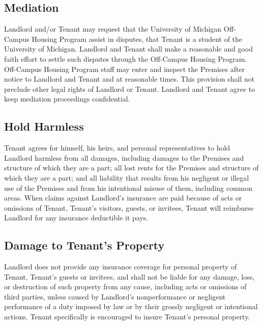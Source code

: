 \documentclass{article}
\begin{document}
\subsection{Mediation}
Landlord and/or Tenant may request that the University of Michigan Off-Campus
Housing Program assist in disputes,  that Tenant is a
student of the University of Michigan. Landlord and Tenant shall make a
reasonable and good faith effort to settle such disputes through the Off-Campus
Housing Program. Off-Campus Housing Program staff may enter and inspect the
Premises after notice to Landlord and Tenant and at reasonable times. This
provision shall not preclude other legal rights of Landlord or Tenant. Landlord
and Tenant agree to keep mediation proceedings confidential.

\subsection{Hold Harmless}
Tenant agrees for himself, his heirs, and personal representatives to hold
Landlord harmless from all damages, including damages to the Premises and
structure of which they are a part; all lost rents for the Premises and
structure of which they are a part; and all liability that results from his
negligent or illegal use of the Premises and from his intentional misuse of
them, including common areas. When claims against Landlord’s insurance are paid
because of acts or omissions of Tenant, Tenant’s visitors, guests, or invitees,
Tenant will reimburse Landlord for any insurance deductible it pays.

\subsection{Damage to Tenant’s Property}
Landlord does not provide any insurance coverage for personal property of
Tenant, Tenant’s guests or invitees, and shall not be liable for any damage,
loss, or destruction of such property from any cause, including acts or
omissions of third parties, unless caused by Landlord’s nonperformance or
negligent performance of a duty imposed by law or by their grossly negligent or
intentional actions. Tenant specifically is encouraged to insure Tenant’s
personal property.
\end{document}
